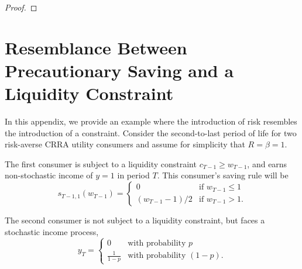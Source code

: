 \documentclass[titlepage]{\econtex}
\providecommand{\wAlt}{\omega}
\begin{document}
\begin{proof}
  \end{proof}

  \section{Resemblance Between Precautionary Saving and a Liquidity Constraint} \label{app:similar}
  In this appendix, we provide an example where the introduction of risk resembles the introduction of a constraint. Consider the second-to-last period of life for two risk-averse CRRA utility consumers and assume for simplicity that $R=\beta=1$.

  The first consumer is subject to a liquidity constraint $c_{T-1} \geq w_{T-1}$, and earns non-stochastic income of ${y}=1$ in period $T$. This consumer's saving rule will be 
  \begin{equation*}
    s_{T-1,1}(w_{T-1}) =
    \begin{cases}
      0   & \mbox{if $w_{T-1} \leq 1$}
      \\    (w_{T-1}-1)/2 & \mbox{if $w_{T-1} > 1$}.
    \end{cases}
  \end{equation*}

  The second consumer is not subject to a liquidity constraint, but 
  faces a stochastic income process,
  \begin{equation*}
    y_{T} = 
    \begin{cases}
      0 & \mbox{with probability $p$}
      \\ \frac{1}{1-p} & \mbox{with probability $(1-p)$}.
    \end{cases}
  \end{equation*}
\end{document}
